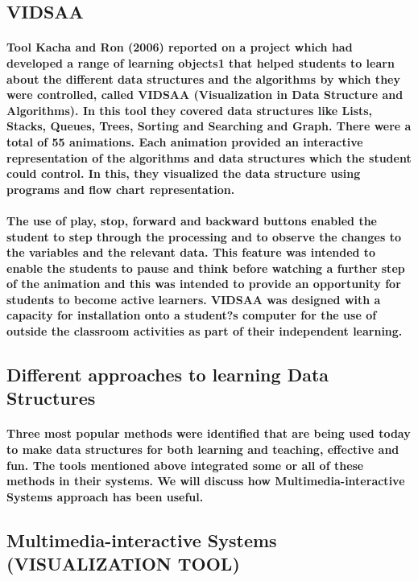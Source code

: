 \documentclass{article}
\begin{document}
\subsection{VIDSAA}
\paragraph{\cite{patel2014literature}Tool Kacha and Ron (2006) reported on a project which had developed a range of learning objects1 that helped students to learn about the different data structures and the algorithms by which they were controlled, called VIDSAA (Visualization in Data Structure and Algorithms). In this tool they covered data structures like Lists, Stacks, Queues, Trees, Sorting and Searching and Graph. There were a total of 55 animations. Each animation provided an interactive representation of the algorithms and data structures which the student could control. In this, they visualized the data structure using programs and flow chart representation.}


\paragraph{The use of play, stop, forward and backward buttons enabled the student to step through the processing and to observe the changes to the variables and the relevant data. This feature was intended to enable the students to pause and think before watching a further step of the animation and this was intended to provide an opportunity for students to become active learners. VIDSAA was designed with a capacity for installation onto a student?s computer for the use of outside the classroom activities as part of their independent learning.}

\subsection{Different approaches to learning Data Structures }

\paragraph{Three most popular methods were identified that are being used today to make data structures for both learning and teaching, effective and fun. The tools mentioned above integrated some or all of these methods in their systems. We will discuss how Multimedia-interactive Systems approach has been useful.}

\subsection{Multimedia-interactive Systems (VISUALIZATION TOOL)}
\end{document}
